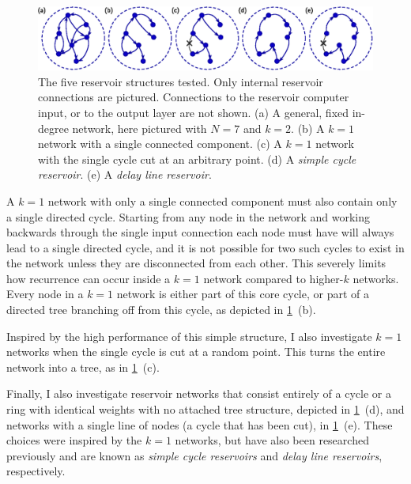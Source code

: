 \begin{figure}
  \includegraphics[width=\textwidth]{figures/topology}
  \caption{The five reservoir structures tested. Only internal
    reservoir connections are pictured. Connections to the reservoir
    computer input, or to the output layer are not shown. (a) A
    general, fixed in-degree network, here pictured with $N=7$ and
    $k=2$. (b) A $k=1$ network with a single connected component. (c)
    A $k=1$ network with the single cycle cut at an arbitrary
    point. (d) A \emph{simple cycle reservoir}. (e) A \emph{delay line
      reservoir}.}%
  \label{fig:topology}
\end{figure}

A $k = 1$ network with only a single connected component must also
contain only a single directed cycle. Starting from any node in the
network and working backwards through the single input connection each
node must have will always lead to a single directed cycle, and it is
not possible for two such cycles to exist in the network unless they
are disconnected from each other. This severely limits how recurrence
can occur inside a $k = 1$ network compared to higher-$k$
networks. Every node in a $k = 1$ network is either part of this core
cycle, or part of a directed tree branching off from this cycle, as
depicted in \cref{fig:topology}~(b).

Inspired by the high performance of this simple structure, I also
investigate $k = 1$ networks when the single cycle is cut at a random
point. This turns the entire network into a tree, as in
\cref{fig:topology}~(c).

Finally, I also investigate reservoir networks that consist entirely
of a cycle or a ring with identical weights with no attached tree
structure, depicted in \cref{fig:topology}~(d), and networks with a
single line of nodes (a cycle that has been cut), in
\cref{fig:topology}~(e). These choices were inspired by the $k = 1$
networks, but have also been researched previously and are known as
\emph{simple cycle reservoirs} and \emph{delay line reservoirs},
respectively.\cite{rodan2011}

